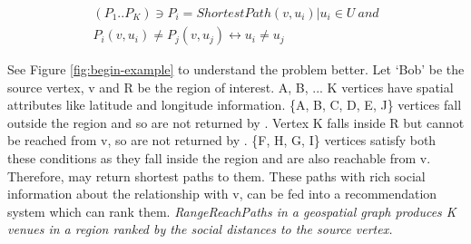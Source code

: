 \begin{eqnarray*}
  	(P_1..P_K) \ni P_i = ShortestPath(v, u_i) | u_i \in U\ and\\
  	P_i(v, u_i) \neq P_j(v, u_j) \leftrightarrow u_i \neq u_j
\end{eqnarray*}

\iffalse
Given a graph $G(V, E)$ where,

\quad$V \rightarrow set\ of\ vertices$

\quad$E \rightarrow set\ of\ edges$

$Vs \subset V$ have spatial attributes; i.e. $\forall v \in Vs \Leftrightarrow v.spatial$ attribute exists\\


\textbf{RangeReachPaths S(G, v, R, K):} an ordered list of K shortest paths starting from v that reach a region R in graph G, where R is a spatial range predicate. Let's abbreviate this as {\rrp}(G, v, R, K).

\textbf{Path, P(u, w):} A set of vertices along the way from u to w \(\Rightarrow w\ is\ reachable\ from\ u\)

\quad${P(u, w) \in S(v, R) \Leftrightarrow}$

\quad\quad{u = v and}

\quad\quad${w \in Vs}$ and

\quad\quad{w.spatial lies in region R}\\

\fi

See Figure \ref{fig:begin-example} to understand the problem better. Let `Bob' be the source vertex, v and R be the region of interest. A, B, ... K vertices have spatial attributes like latitude and longitude information. \{A, B, C, D, E, J\} vertices fall outside the region and so are not returned by {\rrp}. Vertex K falls inside R but cannot be reached from v, so are not returned by {\rrp}. \{F, H, G, I\} vertices satisfy both these conditions as they fall inside the region and are also reachable from v. Therefore, {\rrp} may return shortest paths to them. These paths with rich social information about the relationship with v, can be fed into a recommendation system which can rank them. \textit{RangeReachPaths in a geospatial graph produces K venues in a region ranked by the social distances to the source vertex.}